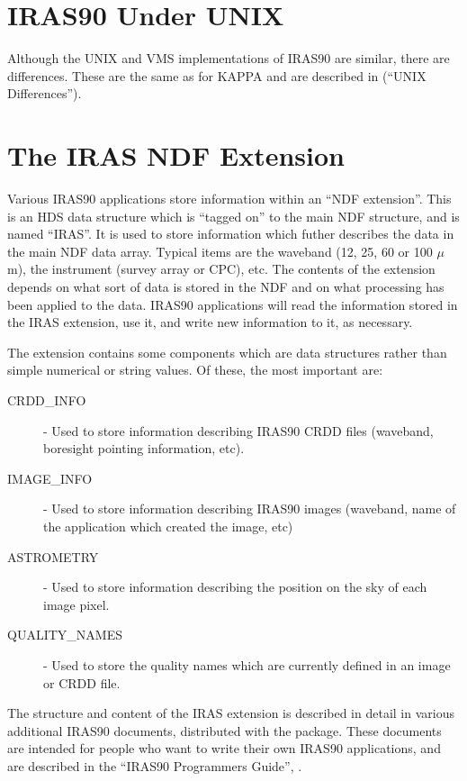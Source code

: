 \documentclass[11pt,nolof,noabs]{starlink}
\begin{document}
\section{IRAS90 Under UNIX}
\label{ap:unixdif}
Although the {\small UNIX} and {\small VMS} implementations of {\small
IRAS90} are similar, there are differences. These are the same as for
{\small KAPPA} and are described in  (``{\small UNIX}
Differences'').

\section{The IRAS NDF Extension}
Various {\small IRAS90} applications store information within an ``{\small NDF}
extension''. This is an {\small HDS} data structure which is ``tagged on'' to
the main {\small NDF} structure, and is named ``IRAS''. It is used to store
information which futher describes the data in the main {\small NDF} data array.
Typical items are the waveband (12, 25, 60 or 100 $\mu$m), the instrument
(survey array or {\small CPC}), etc. The contents of the extension depends on
what sort of data is stored in the {\small NDF} and on what processing has been
applied to the data. {\small IRAS90} applications will read the information
stored in the {\small IRAS} extension, use it, and write new information to it,
as necessary.

The extension contains some components which are data structures rather than
simple numerical or string values. Of these, the most important are:

\begin{description}
\item [CRDD\_INFO] - Used to store information describing {\small IRAS90}
{\small CRDD} files (waveband, boresight pointing information, etc).
\item [IMAGE\_INFO] - Used to store information describing {\small IRAS90}
images (waveband, name of the application which created the image, etc)
\item [ASTROMETRY] - Used to store information describing the position on the
sky of each image pixel.
\item [QUALITY\_NAMES] - Used to store the quality names which are currently
defined in an image or {\small CRDD } file.
\end{description}

The structure and content of the {\small IRAS} extension is described in detail
in various additional {\small IRAS90} documents, distributed with the package.
These documents are intended for people who want to write their own {\small
IRAS90} applications, and are described in the ``{\small IRAS90} Programmers
Guide'', .
\end{document}

